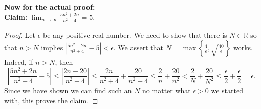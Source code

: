 \documentclass[11pt,dvipsnames]{book}
\numberwithin{figure}{section} %
\numberwithin{table}{section} %
\begin{document}
\begin{example}
{\bf Now for the actual proof:} \\

{\bf Claim:} $\lim_{n\rightarrow\infty}\frac{5n^2+2n}{n^2+4}=5$.

\begin{proof}
Let $\epsilon$ be any positive real number. We need to show that there is $N\in\mathbb{R}$ so that $n> N$ implies $\left|\frac{5n^2+2n}{n^2+4}-5\right|<\epsilon$. We assert that $N=\max\left\{\frac{4}{\epsilon}, \sqrt{\frac{40}{\epsilon}}\right\} $ works. Indeed, if $n> N$, then
\[\left|\frac{5n^2+2n}{n^2+4}-5\right|
\leq \left| \frac{2n-20}{n^2+4} \right|
\leq \frac{2n}{n^2 + 4} + \frac{20}{n^2 + 4}
\leq \frac{2}{n} + \frac{20}{n^2} < \frac{2}{N} + \frac{20}{N^2} \leq \frac{\epsilon}{2}+ \frac{\epsilon}{2} = \epsilon.
\]
 Since we have shown we can find such an $N$ no matter what $\epsilon>0$ we started with, this proves the claim.

\end{proof}
\end{example}
\end{document}
